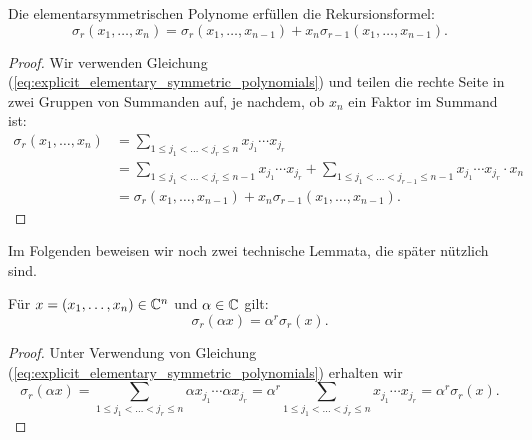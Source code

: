 \begin{lemma}
    \label{lemma:recursion_elementary_symmetric_polynomials}
    Die elementarsymmetrischen Polynome erfüllen die Rekursionsformel:
    \begin{equation}
        \label{eq:recursion_elementary_symmetric_polynomials}
        \sigma_r (x_1, \dots, x_{n}) = \sigma_r (x_1, \dots, x_{n-1}) + x_{n} \sigma_{r-1} (x_1, \dots, x_{n-1}).
    \end{equation}
\end{lemma}
\begin{proof}
    Wir verwenden Gleichung (\ref{eq:explicit_elementary_symmetric_polynomials})
    und teilen die rechte Seite in zwei Gruppen von Summanden auf, je nachdem,
    ob $x_n$ ein Faktor im Summand ist:
    \begin{equation*}
        \begin{split}
            \sigma_r (x_1, \dots, x_{n})
            &= \sum_{1 \leq j_1 < \dots < j_r \leq n} x_{j_1} \cdots x_{j_r}\\
            &= \sum_{1 \leq j_1 < \dots < j_r \leq n-1} x_{j_1} \cdots x_{j_r}
            + \sum_{1 \leq j_1 < \dots < j_{r-1} \leq n-1} x_{j_1} \cdots x_{j_r} \cdot x_{n}\\
            &= \sigma_r (x_1, \dots, x_{n-1}) + x_{n} \sigma_{r-1} (x_1, \dots, x_{n-1}).
        \end{split}
    \end{equation*}
\end{proof}

\noindent Im Folgenden beweisen wir noch zwei technische Lemmata, die später
nützlich sind.

\begin{lemma}
    \label{lemma:elementary_symmetric_polynomials_const_multiplication}
    Für $x = (x_1, \dots, x_n) \in \mathbb{C}^n$ und $\alpha \in \mathbb{C}$ gilt:
    \begin{equation}
        \label{eq:elementary_symmetric_polynomials_const_multiplication}
        \sigma_{r}(\alpha x)
        = \alpha^{r} \sigma_{r}(x).
    \end{equation}
\end{lemma}
\begin{proof}
    Unter Verwendung von Gleichung
    (\ref{eq:explicit_elementary_symmetric_polynomials})
    erhalten wir
    \[
        \sigma_{r}(\alpha x)
        = \sum_{1 \leq j_1 < \dots < j_r \leq n} \alpha x_{j_1} \cdots \alpha x_{j_r}
        = \alpha^r \sum_{1 \leq j_1 < \dots < j_r \leq n} x_{j_1} \cdots x_{j_r}
        = \alpha^r \sigma_{r}(x).
    \]
\end{proof}

